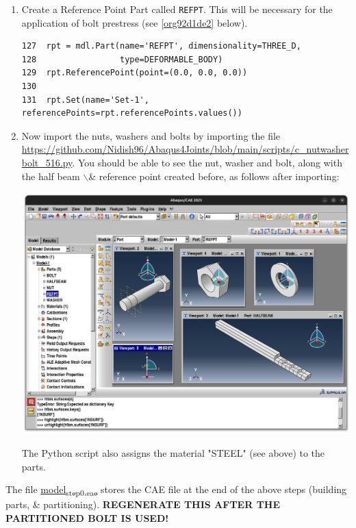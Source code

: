 \documentclass[11pt]{article}
\begin{document}
\begin{enumerate}
\item Create a Reference Point Part called \texttt{REFPT}.
This will be necessary for the application of bolt prestress (see \ref{org92d1de2} below).
\begin{verbatim}
127  rpt = mdl.Part(name='REFPT', dimensionality=THREE_D, 
128                 type=DEFORMABLE_BODY)
129  rpt.ReferencePoint(point=(0.0, 0.0, 0.0))
130  
131  rpt.Set(name='Set-1', referencePoints=rpt.referencePoints.values())
\end{verbatim}
\item Now import the nuts, washers and bolts by importing the file \url{https://github.com/Nidish96/Abaqus4Joints/blob/main/scripts/c\_nutwasherbolt\_516.py}.
You should be able to see the nut, washer and bolt, along with the half beam $\backslash$& reference point created before, as follows after importing:
\begin{center}
\includegraphics[width=.9\linewidth]{./figs/nwb.png}
\end{center}
The Python script also assigns the material "STEEL" (see above) to the parts.
\end{enumerate}

The file \href{https://github.com/Nidish96/Abaqus4Joints/blob/main/assets/assembly/model\_step0.cae}{model\textsubscript{step0.cae}} stores the CAE file at the end of the above steps (building parts, \& partitioning).
\textbf{REGENERATE THIS AFTER THE PARTITIONED BOLT IS USED!}
\end{document}
